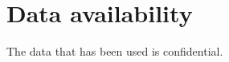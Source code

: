 \documentclass[3p,authoryear]{elsarticle}
\begin{document}
\section*{Data availability}
The data that has been used is confidential.

\appendix




% 
% 
\end{document}
